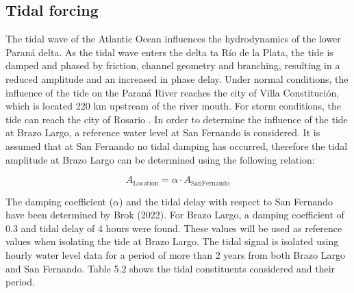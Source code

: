 \subsection{Tidal forcing}
\label{sec:tidal forcing}
The tidal wave of the Atlantic Ocean influences the hydrodynamics of the lower Paraná delta. As the tidal wave enters the delta ta Río de la Plata, the tide is damped and phased by friction, channel geometry and branching, resulting in a reduced amplitude and an increased in phase delay. Under normal conditions, the influence of the tide on the Paraná River reaches the city of Villa Constitución, which is located 220 km upstream of the river mouth. For storm conditions, the tide can reach the city of Rosario \autocite{balayCausesPeriodicityLarge2018}. In order to determine the influence of the tide at Brazo Largo, a reference water level at San Fernando is considered. It is assumed that at San Fernando no tidal damping has occurred, therefore the tidal amplitude at Brazo Largo can be determined using the following relation:

\begin{equation}
    A_{\text{Location}} = \alpha \cdot A_{\text{SanFernando}}
\end{equation}

The damping coefficient ($\alpha$) and the tidal delay with respect to San Fernando have been determined by Brok (2022). For Brazo Largo, a damping coefficient of 0.3 and tidal delay of 4 hours were found. These values will be used as reference values when isolating the tide at Brazo Largo. The tidal signal is isolated using hourly water level data for a period of more than 2 years from both Brazo Largo and San Fernando. Table 5.2 shows the tidal constituents  considered and their period.

